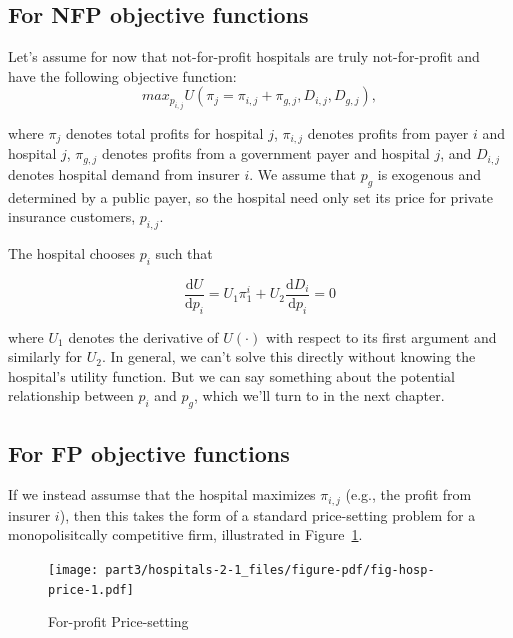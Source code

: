\documentclass[
  letterpaper,
  DIV=11,
  numbers=noendperiod]{scrreport}
\theoremstyle{definition}
\theoremstyle{remark}
\begin{document}
\hypertarget{for-nfp-objective-functions}{%
\subsection{For NFP objective
functions}\label{for-nfp-objective-functions}}

Let's assume for now that not-for-profit hospitals are truly
not-for-profit and have the following objective function:
\[max_{p_{i,j}} U\left( \pi_{j} = \pi_{i,j} + \pi_{g,j},D_{i,j}, D_{g,j} \right),\]

where \(\pi_{j}\) denotes total profits for hospital \(j\),
\(\pi_{i,j}\) denotes profits from payer \(i\) and hospital \(j\),
\(\pi_{g,j}\) denotes profits from a government payer and hospital
\(j\), and \(D_{i,j}\) denotes hospital demand from insurer \(i\). We
assume that \(p_{g}\) is exogenous and determined by a public payer, so
the hospital need only set its price for private insurance customers,
\(p_{i,j}\).

The hospital chooses \(p_{i}\) such that

\[\frac{\mathrm{d}U}{\mathrm{d}p_{i}} = U_{1} \pi_{1}^{i} + U_{2} \frac{\mathrm{d}D_{i}}{\mathrm{d}p_{i}}=0\]

where \(U_{1}\) denotes the derivative of \(U(\cdot)\) with respect to
its first argument and similarly for \(U_{2}\). In general, we can't
solve this directly without knowing the hospital's utility function. But
we can say something about the potential relationship between \(p_{i}\)
and \(p_{g}\), which we'll turn to in the next chapter.

\hypertarget{for-fp-objective-functions}{%
\subsection{For FP objective
functions}\label{for-fp-objective-functions}}

If we instead assumse that the hospital maximizes \(\pi_{i,j}\) (e.g.,
the profit from insurer \(i\)), then this takes the form of a standard
price-setting problem for a monopolisitcally competitive firm,
illustrated in Figure~\ref{fig-hosp-price}.

\begin{figure}

{\centering \texttt{[image: part3/hospitals-2-1\_files/figure-pdf/fig-hosp-price-1.pdf]}

}

\caption{\label{fig-hosp-price}For-profit Price-setting}

\end{figure}
\end{document}
